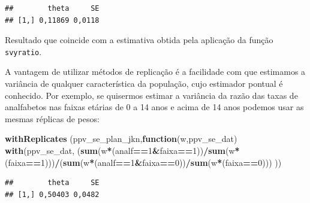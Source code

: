 \documentclass[]{book}
\newenvironment{Shaded}{\begin{snugshade}}{\end{snugshade}}
\newcommand{\KeywordTok}[1]{\textcolor[rgb]{0.13,0.29,0.53}{\textbf{#1}}}
\newcommand{\DecValTok}[1]{\textcolor[rgb]{0.00,0.00,0.81}{#1}}
\newcommand{\ControlFlowTok}[1]{\textcolor[rgb]{0.13,0.29,0.53}{\textbf{#1}}}
\newcommand{\OperatorTok}[1]{\textcolor[rgb]{0.81,0.36,0.00}{\textbf{#1}}}
\newcommand{\NormalTok}[1]{#1}
\theoremstyle{definition}
\theoremstyle{definition}
\theoremstyle{definition}
\theoremstyle{remark}
\begin{document}
\begin{Shaded}
\end{Shaded}

\begin{verbatim}
##        theta     SE
## [1,] 0,11869 0,0118
\end{verbatim}

Resultado que coincide com a estimativa obtida pela aplicação da função
\texttt{svyratio}.

A vantagem de utilizar métodos de replicação é a facilidade com que
estimamos a variância de qualquer característica da população, cujo
estimador pontual é conhecido. Por exemplo, se quisermos estimar a
variância da razão das taxas de analfabetos nas faixas etárias de 0 a 14
anos e acima de 14 anos podemos usar as mesmas réplicas de pesos:

\begin{Shaded}
\begin{Highlighting}[]
\KeywordTok{withReplicates}\NormalTok{ (ppv_se_plan_jkn,}\ControlFlowTok{function}\NormalTok{(w,ppv_se_dat) }\KeywordTok{with}\NormalTok{(ppv_se_dat,}
\NormalTok{(}\KeywordTok{sum}\NormalTok{(w}\OperatorTok{*}\NormalTok{(analf}\OperatorTok{==}\DecValTok{1}\OperatorTok{&}\NormalTok{faixa}\OperatorTok{==}\DecValTok{1}\NormalTok{))}\OperatorTok{/}\KeywordTok{sum}\NormalTok{(w}\OperatorTok{*}\NormalTok{(faixa}\OperatorTok{==}\DecValTok{1}\NormalTok{)))}\OperatorTok{/}\NormalTok{(}\KeywordTok{sum}\NormalTok{(w}\OperatorTok{*}\NormalTok{(analf}\OperatorTok{==}\DecValTok{1}\OperatorTok{&}\NormalTok{faixa}\OperatorTok{==}\DecValTok{0}\NormalTok{))}\OperatorTok{/}\KeywordTok{sum}\NormalTok{(w}\OperatorTok{*}\NormalTok{(faixa}\OperatorTok{==}\DecValTok{0}\NormalTok{)))}
\NormalTok{))  }
\end{Highlighting}
\end{Shaded}

\begin{verbatim}
##        theta     SE
## [1,] 0,50403 0,0482
\end{verbatim}
\end{document}
